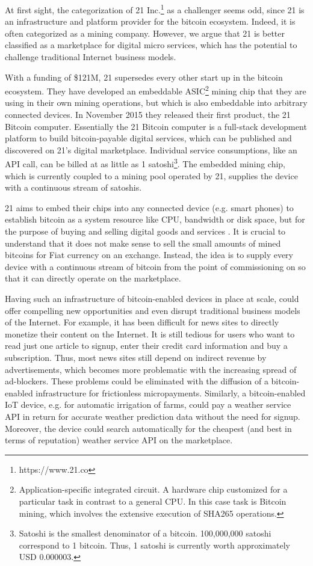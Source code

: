 At first sight, the categorization of 21 Inc.\footnote{https://www.21.co} as a challenger seems odd, 
since 21 is an infrastructure and platform provider for the bitcoin ecosystem. 
Indeed, it is often categorized as a mining company. However, we argue that 21 
is better classified as a marketplace for digital micro services, which has the 
potential to challenge traditional Internet business models.

With a funding of \$121M, 21 supersedes every other start up in the bitcoin ecosystem. 
They have developed an embeddable ASIC\footnote{ Application-specific integrated 
circuit. A hardware chip customized for a particular task in contrast to a general 
CPU. In this case task is Bitcoin mining, which involves the extensive execution 
of SHA265 operations.} mining chip that they are using in their own mining operations, 
but which is also embeddable into arbitrary connected devices. In November 2015 
they released their first product, the 21 Bitcoin computer. Essentially the 21 
Bitcoin computer is a full-stack development platform to build bitcoin-payable 
digital services, which can be published and discovered on 21's digital marketplace. 
Individual service consumptions, like an API call, can be billed at as little as 
1 satoshi\footnote{Satoshi is the smallest denominator of a bitcoin. 100,000,000 
satoshi correspond to 1 bitcoin. Thus, 1 satoshi is currently worth approximately 
USD 0.000003.}. The embedded mining chip, which is currently coupled to a mining 
pool operated by 21, supplies the device with 
a continuous stream of satoshis.

21 aims to embed their chips into any connected device (e.g. smart phones) to establish 
bitcoin as a system resource like CPU, bandwidth or disk space, but for the purpose 
of buying and selling digital goods and services \parencite{Balaji2015}. It is crucial 
to understand that it does not make sense to sell the small amounts of mined bitcoins 
for Fiat currency on an exchange. Instead, the idea is to supply every device with 
a continuous stream of bitcoin from the point of commissioning on so that it can 
directly operate on the marketplace. 

Having such an infrastructure of bitcoin-enabled devices in place at scale, could 
offer compelling new opportunities and even disrupt traditional business models 
of the Internet. For example, it has been difficult for news sites to directly 
monetize their content on the Internet. It is still tedious for users who want 
to read just one article to signup, enter their credit card information and buy 
a subscription. Thus, most news sites still depend on indirect revenue by advertisements, 
which becomes more problematic with the increasing spread of ad-blockers. These 
problems could be eliminated with the diffusion of a bitcoin-enabled infrastructure 
for frictionless micropayments. Similarly, a bitcoin-enabled IoT device, e.g. for 
automatic irrigation of farms, could pay a weather service API in return for accurate 
weather prediction data without the need for signup. Moreover, the device could 
search automatically for the cheapest (and best in terms of reputation) weather 
service API on the marketplace.


